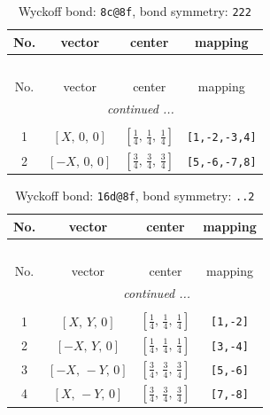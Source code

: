 \documentclass[fleqn,8pt]{jsarticle}
\begin{document}
\begin{longtable}{cccc}
\caption{Wyckoff bond: {\tt 8c@8f}, bond symmetry: {\tt 222}}
 \\
 \hline \hline
No. & vector & center & mapping \\ \hline \endfirsthead

\multicolumn{3}{l}{\tablename\ \thetable{}} \\
 \hline \hline
No. & vector & center & mapping \\ \hline \endhead

 \hline \hline
\multicolumn{3}{r}{\footnotesize\it continued ...} \\ \endfoot

 \hline \hline
\multicolumn{3}{r}{} \\ \endlastfoot

1 & $\left[ X,\, 0,\, 0 \right]$ & $\left[ \frac{1}{4},\, \frac{1}{4},\, \frac{1}{4} \right]$ & {\tt [1,-2,-3,4]} \\ \hline
2 & $\left[ - X,\, 0,\, 0 \right]$ & $\left[ \frac{3}{4},\, \frac{3}{4},\, \frac{3}{4} \right]$ & {\tt [5,-6,-7,8]} \\
\end{longtable}
\renewcommand{\arraystretch}{1.2}
\begin{longtable}{cccc}
\caption{Wyckoff bond: {\tt 16d@8f}, bond symmetry: {\tt ..2}}
 \\
 \hline \hline
No. & vector & center & mapping \\ \hline \endfirsthead

\multicolumn{3}{l}{\tablename\ \thetable{}} \\
 \hline \hline
No. & vector & center & mapping \\ \hline \endhead

 \hline \hline
\multicolumn{3}{r}{\footnotesize\it continued ...} \\ \endfoot

 \hline \hline
\multicolumn{3}{r}{} \\ \endlastfoot

1 & $\left[ X,\, Y,\, 0 \right]$ & $\left[ \frac{1}{4},\, \frac{1}{4},\, \frac{1}{4} \right]$ & {\tt [1,-2]} \\ \hline
2 & $\left[ - X,\, Y,\, 0 \right]$ & $\left[ \frac{1}{4},\, \frac{1}{4},\, \frac{1}{4} \right]$ & {\tt [3,-4]} \\ \hline
3 & $\left[ - X,\, - Y,\, 0 \right]$ & $\left[ \frac{3}{4},\, \frac{3}{4},\, \frac{3}{4} \right]$ & {\tt [5,-6]} \\ \hline
4 & $\left[ X,\, - Y,\, 0 \right]$ & $\left[ \frac{3}{4},\, \frac{3}{4},\, \frac{3}{4} \right]$ & {\tt [7,-8]} \\
\end{longtable}
\end{document}

